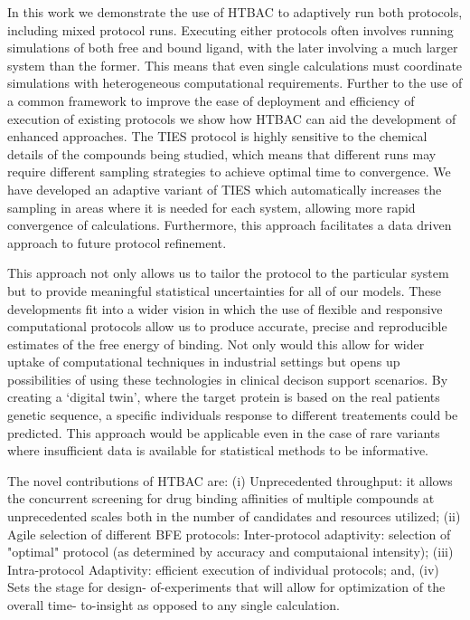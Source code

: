 In this work we demonstrate the use of HTBAC to adaptively run both protocols,
including mixed protocol runs. Executing either protocols often involves
running simulations of both free and  bound  ligand, with the later involving
a much larger system than the former. This means that even single calculations
must coordinate simulations with heterogeneous computational requirements.
Further to the use of a common framework to improve the ease of deployment and
efficiency of execution of existing protocols we show how HTBAC can aid the
development of enhanced approaches. The TIES protocol is highly sensitive to
the chemical details of the compounds being studied, which means that
different runs may require different sampling strategies to achieve optimal
time to convergence. We have developed an adaptive variant of TIES which
automatically increases the sampling in areas where it is needed for each
system, allowing more rapid convergence of calculations. Furthermore, this
approach facilitates a data driven approach to future protocol refinement.

This approach not only allows us to tailor the protocol to the particular
system but to provide meaningful statistical uncertainties for all of our
models. These developments fit into a wider vision in which the use of
flexible and responsive computational protocols allow us to produce accurate,
precise and reproducible estimates of the free energy of binding. Not only
would this allow for wider uptake of computational techniques in industrial
settings but opens up possibilities of using these technologies in clinical
decison support scenarios. By creating a `digital twin', where the target
protein is based on the real patients genetic sequence, a specific individuals
response to different treatements could be predicted. This approach would be
applicable even in the case of rare variants where insufficient data is
available for statistical methods to be informative.

The novel contributions of HTBAC are: (i) Unprecedented throughput: it allows
the concurrent screening for drug binding affinities of multiple compounds at
unprecedented scales both in the number of candidates and resources utilized;
(ii) Agile selection of different BFE protocols: Inter-protocol adaptivity:
selection of "optimal" protocol (as determined by accuracy and computaional
intensity); (iii) Intra-protocol Adaptivity: efficient execution of individual
protocols; and, (iv) Sets the stage for design- of-experiments that will allow
for optimization of the overall  time- to-insight as opposed to any single
calculation.


